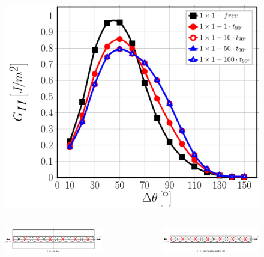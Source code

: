 \documentclass[first,firstsupp,lastsupp,last,hyperref,table]{ETHclass}
\begin{document}
\begin{frame}
\begin{columns}[c]
\begin{column}{0.5\textwidth}
\begin{figure}
\includegraphics[width=\columnwidth]{1x1-i-vf60-GII-free.pdf}
\end{figure}
\end{column}
\end{columns}
\begin{columns}[c]
\centering
\begin{column}{0.5\textwidth}
\begin{figure}
\centering
\includegraphics[width=\columnwidth]{zeroplythickness.pdf}
\end{figure}
\end{column}
\begin{column}{0.5\textwidth}
\centering
\begin{figure}
\centering
\includegraphics[width=\columnwidth]{zeroplythickness-eqBC.pdf}
\end{figure}
\end{column}
\end{columns}
\end{frame}
\end{document}
